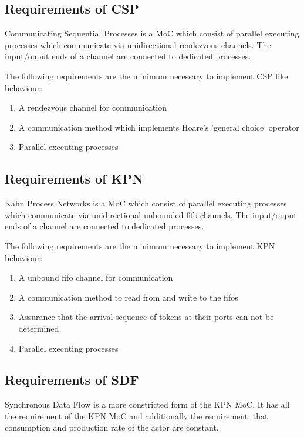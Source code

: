 \subsection{Requirements of CSP}
Communicating Sequential Processes \cite{csphoare:1985}
is a MoC which consist of parallel executing processes
which communicate via unidirectional rendezvous channels.
The input/ouput ends of a channel are connected to dedicated
processes.

The following requirements are the minimum necessary to
implement CSP like behaviour:

\begin{enumerate}
\item A rendezvous channel for communication
\item A communication method which implements Hoare's 'general choice' operator \cite{csphoare:1985}
\item Parallel executing processes
\end{enumerate}

\subsection{Requirements of KPN}
Kahn Process Networks \cite{kahn:1974}
is a MoC which consist of parallel executing processes
which communicate via unidirectional unbounded fifo channels.
The input/ouput ends of a channel are connected to dedicated
processes.

The following requirements are the minimum necessary to
implement KPN behaviour:

\begin{enumerate}
\item A unbound fifo channel for communication
\item A communication method to read from and write to the fifos
\item Assurance that the arrival sequence of tokens at
      their ports can not be determined
\item Parallel executing processes
\end{enumerate}

\subsection{Requirements of SDF}
Synchronous Data Flow \cite{sdf:xxx}
is a more constricted form of the KPN MoC.
It has all the requirement of the KPN MoC and
additionally the requirement, that consumption and
production rate of the actor are constant.

